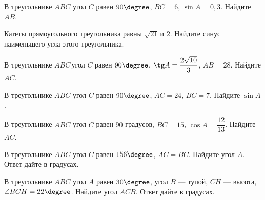 \begin{homework}[number=2]
	\begin{listofex}
		\item В треугольнике \( ABC \) угол \( C \) равен \( 90\degree \), \( BC=6 \), \( \sin A=0,3 \). Найдите \( AB \).
		\item Катеты прямоугольного треугольника равны  \( \sqrt{21} \) и \( 2 \). Найдите синус наименьшего угла этого треугольника.
		\item В треугольнике \( ABC \) угол \( C \) равен \( 90\degree \), \( \tg A=\dfrac{2\sqrt{10}}{3} \),  \( AB=28 \). Найдите \( AC \).
		\item В треугольнике \( ABC \) угол \( C \) равен \( 90\degree \), \( AC=24 \), \( BC=7 \). Найдите \( \sin A \).
		\item В треугольнике \( ABC \) угол \( C \) равен \( 90 \) градусов, \( BC=15 \), \( \cos A=\dfrac{12}{13} \).  Найдите \( AC \).
		\item В треугольнике \( ABC \) угол \( C \) равен \( 156\degree \), \( AC=BC \). Найдите угол \( A \). Ответ дайте в градусах.
		\item В треугольнике \( ABC \) угол \( A \) равен \( 30\degree \), угол \( B \) --- тупой, \( CH \) --- высота, \( \angle BCH=22\degree \). Найдите угол \( ACB \). Ответ дайте в градусах.
	\end{listofex}
\end{homework}

